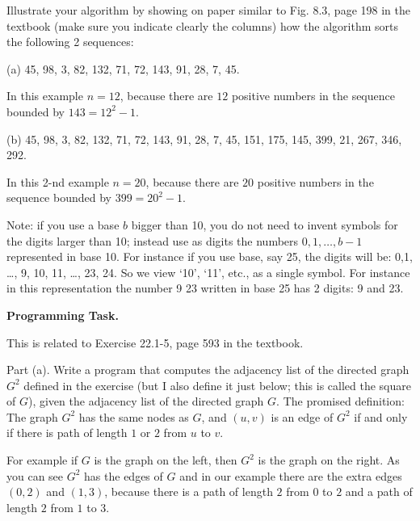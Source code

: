 \documentclass[11pt]{article}
\begin{document}
Illustrate your algorithm by showing on paper similar to Fig. 8.3, page 198 in the textbook (make sure you indicate clearly the columns)  how the algorithm sorts the following 2 sequences: 
\smallskip

(a) 45, 98, 3, 82, 132, 71, 72, 143, 91, 28, 7, 45.

In this example $n=12$, because there are $12$ positive numbers in the sequence bounded by $143 = 12^2 - 1$. 
\smallskip

(b) 45, 98, 3, 82, 132, 71, 72, 143, 91, 28, 7, 45, 151, 175, 145, 399, 21, 267, 346, 292.

In this 2-nd example $n=20$, because there are $20$ positive numbers in the sequence bounded by $399= 20^2 - 1$. 
\bigskip

Note: if you use a base $b$ bigger than 10, you do not need to invent symbols for the digits larger than 10; instead use as digits the numbers $0,1, \ldots, b-1$ represented in base 10. For instance if you use base, say 25, the digits will be: 0,1, \ldots, 9, 10, 11, \ldots, 23, 24. So  we view `10', `11', etc., as a single symbol. For instance in this representation the number 9 23 written in base 25 has 2 digits: 9 and 23. 

\newpage




\textbf{Programming Task.}

 This is related to Exercise 22.1-5, page 593 in the textbook.  

Part (a). Write a program  that computes the adjacency list of the directed  graph $G^2$ defined in the exercise (but I also define it just below; this is called the square of $G$), given the adjacency list of the directed graph $G$. 
The promised definition: The graph $G^2$ has the same nodes as $G$, and $(u,v)$ is an edge of $G^2$ if and only if there is path of length $1$ or $2$ from $u$ to $v$.

For example if $G$ is the graph on the left, then $G^2$  is the graph on the right. As you can see $G^2$ has the edges of $G$ and in our example there are the extra edges $(0,2)$ and $(1,3)$, because there is a path of length $2$ from $0$ to $2$ and a path of length $2$ from $1$ to $3$.
\end{document}
